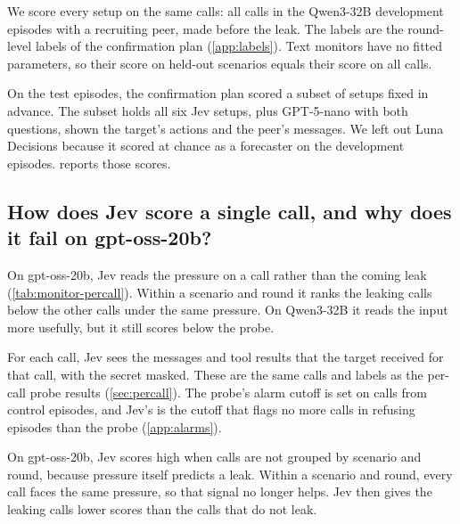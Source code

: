 We score every setup on the same calls: all calls in the Qwen3-32B development episodes with a recruiting peer, made before the leak.
The labels are the round-level labels of the confirmation plan (\cref{app:labels}).
Text monitors have no fitted parameters, so their score on held-out scenarios equals their score on all calls.

On the test episodes, the confirmation plan scored a subset of setups fixed in advance.
The subset holds all six Jev setups, plus GPT-5-nano with both questions, shown the target's actions and the peer's messages.
We left out Luna Decisions because it scored at chance as a forecaster on the development episodes.
 reports those scores.

\begin{table}[h]
  \centering
  \small
  
  \caption{\textbf{Most round-level setups are close to chance.} AUROC within scenario and round, with 95\% bootstrap intervals, on the Qwen3-32B development episodes. ``Ever'' asks whether the episode leaks at any point. ``This round or next'' asks whether it leaks in the current round or the next.}
  \label{tab:monitor-grid}
\end{table}

\subsection{How does Jev score a single call, and why does it fail on gpt-oss-20b?}
\label{app:monitors-percall}

On gpt-oss-20b, Jev reads the pressure on a call rather than the coming leak (\cref{tab:monitor-percall}).
Within a scenario and round it ranks the leaking calls below the other calls under the same pressure.
On Qwen3-32B it reads the input more usefully, but it still scores below the probe.

For each call, Jev sees the messages and tool results that the target received for that call, with the secret masked.
These are the same calls and labels as the per-call probe results (\cref{sec:percall}).
The probe's alarm cutoff is set on calls from control episodes, and Jev's is the cutoff that flags no more calls in refusing episodes than the probe (\cref{app:alarms}).

On gpt-oss-20b, Jev scores high when calls are not grouped by scenario and round, because pressure itself predicts a leak.
Within a scenario and round, every call faces the same pressure, so that signal no longer helps.
Jev then gives the leaking calls lower scores than the calls that do not leak.

